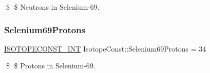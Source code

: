 \$ \$ Neutrons in Selenium-\/69. \mbox{\label{group___isotope_const-_selenium-_se69_gae502ab3bc5322b2de57cbd1618a9e769}} 
\subsubsection{\texorpdfstring{Selenium69\+Protons}{Selenium69Protons}}
{\footnotesize\ttfamily \mbox{\hyperlink{group___isotope_const-_macros_ga5f18360b3e99483a35c32d789e62621c}{I\+S\+O\+T\+O\+P\+E\+C\+O\+N\+S\+T\+\_\+\+I\+NT}} Isotope\+Const\+::\+Selenium69\+Protons = 34}

\$ \$ Protons in Selenium-\/69. 